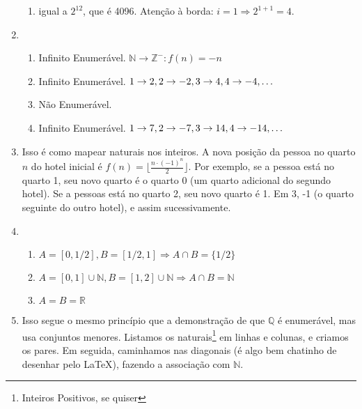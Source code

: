 \documentclass{article}
\begin{document}
\begin{enumerate}
\begin{enumerate}
            \item igual a \( 2^{12} \), que é 4096. Atenção à borda: \( i = 1 \Rightarrow 2^{1+1} = 4 \).

        \end{enumerate}

    \item 

        \begin{enumerate}

            \item Infinito Enumerável. \( \mathbb{N} \to \mathbb{Z}^- : f(n) = -n\)

            \item Infinito Enumerável. \( 1 \to 2, 2 \to -2, 3 \to 4, 4 \to -4, \mathellipsis \)

            \item Não Enumerável.

            \item Infinito Enumerável. \( 1 \to 7, 2 \to -7, 3 \to 14, 4 \to -14, \mathellipsis \)

        \end{enumerate}

    \item Isso é como mapear naturais nos inteiros. A nova posição da pessoa no quarto \( n \) do hotel inicial é \( f(n) = \lfloor \frac{n \cdot (-1)^n}{2} \rfloor \). Por exemplo, se a pessoa está no quarto 1, seu novo quarto é o quarto 0 (um quarto adicional do segundo hotel). Se a pessoas está no quarto 2, seu novo quarto é 1. Em 3, -1 (o quarto seguinte do outro hotel), e assim sucessivamente.

    \item 

        \begin{enumerate}

            \item \( A = [0, 1/2], B = [1/2,1] \Rightarrow A \cap B = \{ 1/2 \}\) 

            \item \( A = [0,1] \cup \mathbb{N}, B = [1,2] \cup \mathbb{N} \Rightarrow A \cap B = \mathbb{N} \)

            \item \( A = B = \mathbb{R} \)

        \end{enumerate}

    \item Isso segue o mesmo princípio que a demonstração de que \( \mathbb{Q} \) é enumerável, mas usa conjuntos menores. Listamos os naturais\footnote{Inteiros Positivos, se quiser} em linhas e colunas, e criamos os pares. Em seguida, caminhamos nas diagonais (é algo bem chatinho de desenhar pelo \LaTeX), fazendo a associação com \( \mathbb{N} \).


\end{enumerate}
\end{document}
